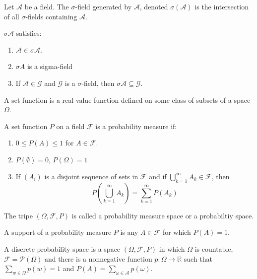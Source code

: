 \documentclass[12pt]{article}
\newcommand{\R}{\mathbb{R}}
\newcommand{\F}{\mathcal{F}}
\newcommand{\A}{\mathcal{A}}
\newcommand{\seq}{\subseteq}
\newcommand{\es}{\emptyset}
\newcommand{\mc}{\mathcal}
\newenvironment{defn}[2][Definition]{\begin{trivlist}
\item[\hskip \labelsep {\bfseries #1}\hskip \labelsep {\bfseries #2.}]}{\end{trivlist}}
\newenvironment{rmrk}[2][Remark]{\begin{trivlist}
\item[\hskip \labelsep {\bfseries #1}\hskip \labelsep {\bfseries #2.}]}{\end{trivlist}}
\begin{document}
\begin{defn}{2}
    Let $\mc A$ be a field. The $\sigma$-field generated by $\mc A$, denoted $\sigma (\mc A)$ is the intersection of all $\sigma$-fields containing $\mc A$.
\end{defn}

\begin{rmrk}{3}
    $\sigma \mc A$ satisfies:
    \begin{enumerate}
        \item $\A \in \sigma \A$.
        \item $\sigma A$ is a sigma-field
        \item If $\A \in \mc G$ and $\mc G$ is a $\sigma$-field, then $\sigma \A \seq \mc G$.
    \end{enumerate}
\end{rmrk}


\begin{defn}{4}
    A set function is a real-value function defined on some class of subsets of a space $\Omega$.
\end{defn}

\begin{defn}{5}
    A set function $P$ on a field $\F$ is a probability measure if:
    \begin{enumerate}
        \item $0 \leq P(A) \leq 1$ for $A \in \mc F$.
        \item $P(\es) = 0$, $P(\Omega) = 1$
        \item If $(A_i)$ is a disjoint sequence of sets in $\F$ and if $\bigcup_{k=1}^{\infty} A_k \in \F$, then
        \[ P \left ( \bigcup_{k=1}^{\infty} A_k \right) = \sum_{k=1}^{\infty} P(A_k) \]
    \end{enumerate}
    The tripe $(\Omega, \F, P)$ is called a probability measure space or a probabiltiy space.
\end{defn}

\begin{defn}{6}
    A support of a probability measure $P$ is any $A \in \F$ for which $P(A) = 1$.
\end{defn}

\begin{defn}{9}
    A discrete probability space is a space $(\Omega, \F, P)$ in which $\Omega$ is countable, $\F = \mc P (\Omega)$ and there is a nonnegative function $p: \Omega \to \R$ such that $\sum_{w \in \Omega} p(w) = 1$ and $P(A) = \sum_{\omega \in \A} p(\omega)$.
\end{defn}
\end{document}
